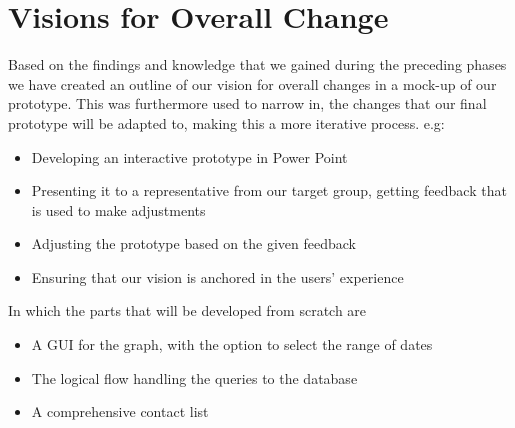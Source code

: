 \documentclass[a4paper,11pt]{article}
\begin{document}

 


\section{Visions for Overall Change}
%
Based on the findings and knowledge that we gained during the preceding phases we have created an outline of our vision for overall changes in a mock-up of our prototype. This was furthermore used to narrow in, the changes that our final prototype will be adapted to, making this a more iterative process. e.g:

\begin{itemize}
    \item Developing an interactive prototype in Power Point
    \item Presenting it to a representative from our target group, getting feedback that is used to make adjustments
    \item Adjusting the prototype based on the given feedback
    \item Ensuring that our vision is anchored in the users' experience
\end{itemize}


In which the parts that will be developed from scratch are 

\begin{itemize}
    \item A GUI for the graph, with the option to select the range of dates
    \item The logical flow handling the queries to the database
    \item A comprehensive contact list
\end{itemize}
\end{document}
